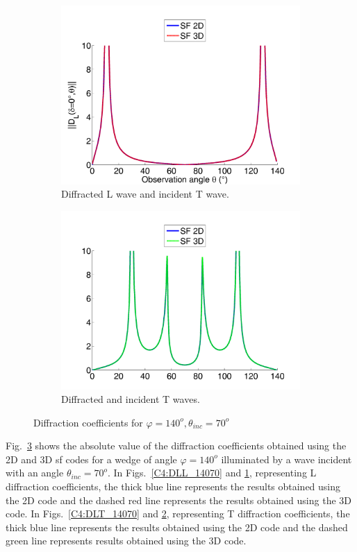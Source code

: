 \begin{figure}
\begin{subfigure}[b]{0.49\textwidth}
        \includegraphics[width=\textwidth]{images/chapter4/XpropL_140_70_0_TH.png}
        \caption{Diffracted L wave and incident T wave.}
        \label{C4:DTL_14070}
    \end{subfigure}
    \begin{subfigure}[b]{0.49\textwidth}
        \includegraphics[width=\textwidth]{images/chapter4/XpropTH_140_70_0_TH.png}
        \caption{Diffracted and incident T waves.}
        \label{C4:DTT_14070}
     \end{subfigure}
     \caption{Diffraction coefficients for $\varphi=140^o, \theta_{inc}=70^o$}
     \label{C4:14070}
\end{figure}

Fig.~\ref{C4:14070} shows the absolute value of the diffraction coefficients obtained using the 2D and 3D \acrshort{sf} codes for a wedge of angle $\varphi=140^o$ illuminated by a wave incident with an angle $\theta_{inc}=70^o$. In Figs.~\ref{C4:DLL_14070} and \ref{C4:DTL_14070}, representing L diffraction coefficients, the thick blue line represents the results obtained using the 2D code and the dashed red line represents the results obtained using the 3D code. In Figs.~\ref{C4:DLT_14070} and \ref{C4:DTT_14070}, representing T diffraction coefficients, the thick blue line represents the results obtained using the 2D code and the dashed green line represents results obtained using the 3D code.

